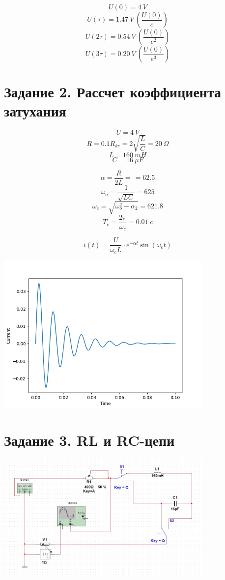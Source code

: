 \documentclass[14pt, a4paper]{article}
\begin{document}
        $$U(0) = 4 \ V$$
        $$U(\tau) = 1.47 \ V \ (\frac{U(0)}{e})$$
        $$U(2\tau) = 0.54 \ V \ (\frac{U(0)}{e^2})$$
        $$U(3\tau) = 0.20 \ V \ (\frac{U(0)}{e^3})$$

    
    \section*{Задание 2. Рассчет коэффициента затухания}
        $$U = 4 \ V$$
        $$R = 0.1R_{kr} = 2\sqrt{\frac{L}{C}} = 20 \ \Omega$$
        $$L = 160\  mH$$
        $$C = 16 \ \mu F$$

        $$\alpha = \frac{R}{2L} = \frac{}{} = 62.5$$
        $$\omega_o = \frac{1}{\sqrt{LC}} = 625$$
        $$\omega_c = \sqrt{\omega_o^2 - \alpha_2} = 621.8$$
        $$T_{c} = \frac{2\pi}{\omega_c} = 0.01 \ c$$

        $$i(t) = \frac{U}{\omega_c L}\cdot e^{-\alpha t}\sin(\omega_c t)$$

        {
            \includegraphics[width=0.8\textwidth]{plot_2.png}
            \centering
        }
    
    
    \section*{Задание 3. RL и RC-цепи}
        {
            \includegraphics[width=0.8\textwidth]{Design.jpg}
            \centering
        }
\end{document}
